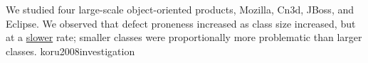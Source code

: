 \documentclass{article}
\begin{document}
  {We studied four large-scale object-oriented products, Mozilla, Cn3d, JBoss, and Eclipse. We observed that defect proneness increased as class size increased, but at a \ul{slower} rate; smaller classes were proportionally more problematic than larger classes.}
  {koru2008investigation}

\end{document}
